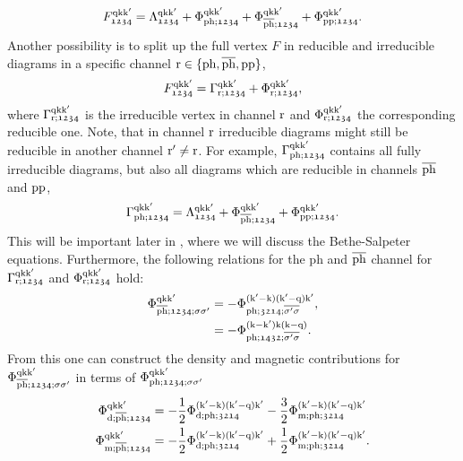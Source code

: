 \documentclass[../../main.tex]{subfiles}
\begin{document}
\begin{align}\label{eq:parquet_decomposition}
	F_{\mathfrak{1234}}^{\text{q}\text{k}\text{k}'}=\Lambda_{\mathfrak{1234}}^{\text{q}\text{k}\text{k}'}+\Phi_{\text{ph};\mathfrak{1234}}^{\text{q}\text{k}\text{k}'}+\Phi_{\overline{\text{ph}};\mathfrak{1234}}^{\text{q}\text{k}\text{k}'}+\Phi_{\text{pp};\mathfrak{1234}}^{\text{q}\text{k}\text{k}'}.
\end{align}
Another possibility is to split up the full vertex $F$ in reducible and irreducible diagrams in a specific channel $\text{r}\in\{\text{ph},\overline{\text{ph}},\text{pp}\}$,
\begin{align}\label{eq:full_vertex_gamma_phi}
	F_{\mathfrak{1234}}^{\text{q}\text{k}\text{k}'}=\Gamma_{\text{r};\mathfrak{1234}}^{\text{q}\text{k}\text{k}'}+\Phi_{\text{r};\mathfrak{1234}}^{\text{q}\text{k}\text{k}'},
\end{align}
where $\Gamma_{\text{r};\mathfrak{1234}}^{\text{q}\text{k}\text{k}'}$ is the irreducible vertex in channel $\text{r}$ and $\Phi_{\text{r};\mathfrak{1234}}^{\text{q}\text{k}\text{k}'}$ the corresponding reducible one. Note, that in channel $\text{r}$ irreducible diagrams might still be reducible in another channel $\text{r}'\neq \text{r}$. For example, $\Gamma_{\text{ph};\mathfrak{1234}}^{\text{q}\text{k}\text{k}'}$ contains all fully irreducible diagrams, but also all diagrams which are reducible in channels $\overline{\text{ph}}$ and $\text{pp}$,
\begin{align}
	\Gamma_{\text{ph};\mathfrak{1234}}^{\text{q}\text{k}\text{k}'}=\Lambda_{\mathfrak{1234}}^{\text{q}\text{k}\text{k}'}+\Phi_{\overline{\text{ph}};\mathfrak{1234}}^{\text{q}\text{k}\text{k}'}+\Phi_{\text{pp};\mathfrak{1234}}^{\text{q}\text{k}\text{k}'}.
\end{align}
This will be important later in , where we will discuss the Bethe-Salpeter equations. Furthermore, the following relations for the ph and $\overline{\text{ph}}$ channel for $\Gamma_{\text{r};\mathfrak{1234}}^{\text{q}\text{k}\text{k}'}$ and $\Phi_{\text{r};\mathfrak{1234}}^{\text{q}\text{k}\text{k}'}$ hold:
\begin{subequations}\label{eq:phi_conversion_ph_bar_to_ph}
\begin{align}
	\Phi_{\overline{\text{ph}};\mathfrak{1234};\sigma\sigma'}^{\text{q}\text{k}\text{k}'}&=-\Phi_{\text{ph};\mathfrak{3214};\overline{\sigma'\sigma}}^{(\text{k}'-\text{k})(\text{k}'-\text{q})\text{k}'},\\
	&=-\Phi_{\text{ph};\mathfrak{1432};\overline{\sigma'\sigma}}^{(\text{k}-\text{k}')\text{k}(\text{k}-\text{q})}.
\end{align}
\end{subequations}
From this one can construct the density and magnetic contributions for $\Phi_{\overline{\text{ph}};\mathfrak{1234};\sigma\sigma'}^{\text{q}\text{k}\text{k}'}$ in terms of $\Phi_{\text{ph};\mathfrak{1234};\sigma\sigma'}^{\text{q}\text{k}\text{k}'}$
\begin{subequations}\label{eq:phi_ph_bar_dens_magn}
\begin{align}
	\Phi_{\text{d};\overline{\text{ph}};\mathfrak{1234}}^{\text{q}\text{k}\text{k}'}&=-\frac12\Phi_{\text{d};\text{ph};\mathfrak{3214}}^{(\text{k}'-\text{k})(\text{k}'-\text{q})\text{k}'}-\frac32\Phi_{\text{m};\text{ph};\mathfrak{3214}}^{(\text{k}'-\text{k})(\text{k}'-\text{q})\text{k}'}\\
	\Phi_{\text{m};\overline{\text{ph}};\mathfrak{1234}}^{\text{q}\text{k}\text{k}'}&=-\frac12\Phi_{\text{d};\text{ph};\mathfrak{3214}}^{(\text{k}'-\text{k})(\text{k}'-\text{q})\text{k}'}+\frac12\Phi_{\text{m};\text{ph};\mathfrak{3214}}^{(\text{k}'-\text{k})(\text{k}'-\text{q})\text{k}'}.
\end{align}
\end{subequations}
\end{document}
